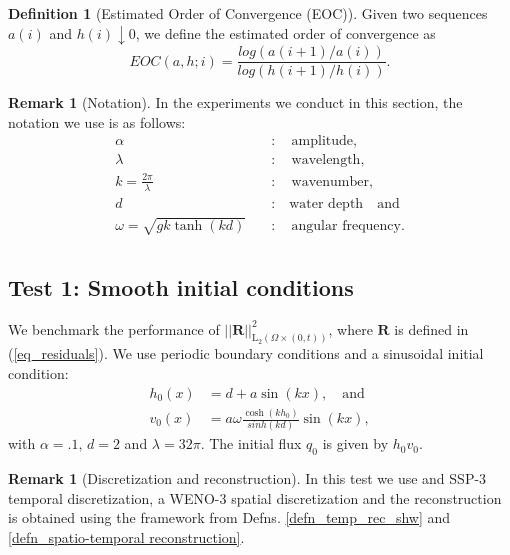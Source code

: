 \documentclass[12pt,a4paper]{article}
\numberwithin{equation}{section}
\theoremstyle{definition}
\newcommand{\Norm}[1]{\left|\left|#1\right|\right|}
\newcommand{\vect}[1]{\textbf{#1}}
\newcommand{\leb}{\text{L}}
\newcommand{\qp}[1]{\left(#1\right)}
\newtheorem{Defn}[subsection]{Definition}
\newtheorem{Rem}[subsection]{Remark}
\begin{document}
\begin{Defn}[Estimated Order of Convergence (EOC)] Given two sequences $a\qp{i}$ and $h\qp{i}\downarrow 0$, we define the estimated order of convergence as
\begin{equation}
EOC\qp{a,h;i} = \frac{log\qp{a\qp{i+1}/a\qp{i}}}{log\qp{h\qp{i+1}/h\qp{i}}}.
\end{equation}
\end{Defn}
\begin{Rem}[Notation]
In the experiments we conduct in this section,  the notation we use is as follows:
\begin{equation}\label{eq_quantities_test}
\begin{aligned}
\alpha\quad &:\quad \text{amplitude},\\
\lambda\quad &:\quad \text{wavelength},\\
k=\frac{2\pi}{\lambda}\quad &:\quad \text{wavenumber},\\
d\quad &:\quad \text{water depth}\quad \text{and}\\
\omega = \sqrt{gk\tanh\qp{kd}}\quad &:\quad \text{angular frequency}.\\
\end{aligned}
\end{equation}
\end{Rem}
\subsection{Test 1: Smooth initial conditions}  We benchmark the performance of $\Norm{\vect{R}}^2_{\leb_2\qp{\Omega\times\qp{0,t}}}$, where $\vect{R}$ is defined in  (\ref{eq_residuals}).  We use periodic boundary conditions and a sinusoidal initial condition:
\begin{equation}\label{eq_ic_test}
\begin{aligned}
h_0\qp{x}&= d+a\sin\qp{kx},\quad \text{and}\\
v_0\qp{x}&=a\omega \frac{\cosh\qp{kh_0}}{sinh(kd)}\sin(k x),
\end{aligned}
\end{equation}
with $\alpha =.1,\, d=2$ and $\lambda = 32\pi$.  The initial flux $q_0$ is given by $h_0v_0$.  
\begin{Rem}[Discretization and reconstruction] 
In this test we use and SSP-3 temporal discretization, a WENO-3 spatial discretization and the reconstruction is obtained using the framework from Defns. \ref{defn_temp_rec_shw} and \ref{defn_spatio-temporal reconstruction}.
\end{Rem}
\end{document}
